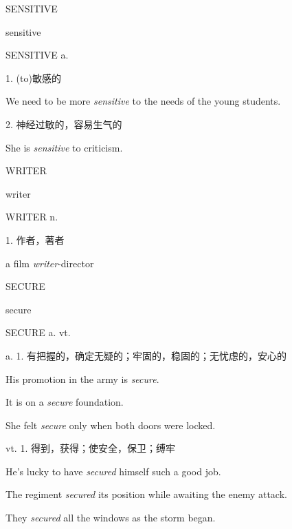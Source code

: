 \begin{flashcard}{
SENSITIVE

sensitive
}
\begin{center}
SENSITIVE a. 
\end{center}
1. (to)敏感的

We need to be more \textit{sensitive} to the needs of the young students.

2. 神经过敏的，容易生气的

She is \textit{sensitive} to criticism.

\end{flashcard}
\begin{flashcard}{
WRITER

writer
}
\begin{center}
WRITER n. 
\end{center}
1. 作者，著者

a film \textit{writer}-director

\end{flashcard}
\begin{flashcard}{
SECURE

secure
}
\begin{center}
SECURE a. vt. 
\end{center}
\normalsize a. 1. 有把握的，确定无疑的；牢固的，稳固的；无忧虑的，安心的

\footnotesize His promotion in the army is \textit{secure}.

\footnotesize It is on a \textit{secure} foundation.

\footnotesize She felt \textit{secure} only when both doors were locked.

\normalsize vt. 1. 得到，获得；使安全，保卫；缚牢

\footnotesize He's lucky to have \textit{secured} himself such a good job.

\footnotesize The regiment \textit{secured} its position while awaiting the enemy attack.

\footnotesize They \textit{secured} all the windows as the storm began.

\end{flashcard}
